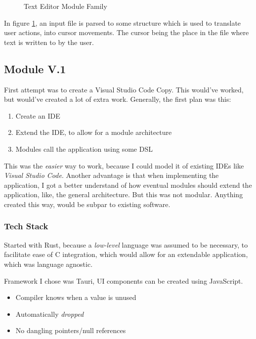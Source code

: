 \begin{figure}
  \centering
  
  \caption{Text Editor Module Family}
  \label{fig:textEditorSimple}
\end{figure}

In figure \ref{fig:textEditorSimple}, an input file is parsed to some structure
which is used to translate user actions, into cursor movements. The cursor being
the place in the file where text is written to by the user.

\subsection{Module V.1}


First attempt was to create a Visual Studio Code Copy. This would've worked, but
would've created a lot of extra work.
Generally, the first plan was this:
\begin{enumerate}
  \item Create an IDE
  \item Extend the IDE, to allow for a module architecture
  \item Modules call the application using some DSL
\end{enumerate}

This was the \textit{easier} way to work, because I could model it of existing
IDEs like \textit{Visual Studio Code}. Another advantage is that when
implementing the application, I got a better understand of how eventual modules
should extend the application, like, the general architecture. But this was not
modular. Anything created this way, would be subpar to existing software.

\subsubsection{Tech Stack}

Started with Rust, because a \textit{low-level} language was assumed to be
necessary, to facilitate ease of C integration, which would allow for an
extendable application, which was language agnostic.

Framework I chose was Tauri, UI components can be created using JavaScript.

\begin{itemize}
  \item Compiler knows when a value is unused
  \item Automatically \textit{dropped}
  \item No dangling pointers/null references
\end{itemize}

